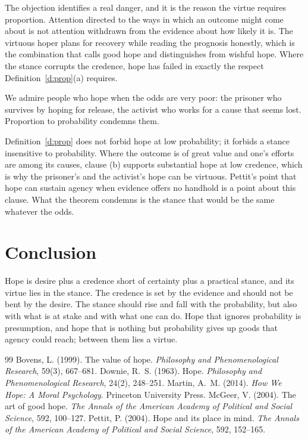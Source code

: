 \documentclass{situationist-preprint}
\begin{document}
\begin{reply}
The objection identifies a real danger, and it is the reason the virtue requires proportion. Attention directed to the ways in which an outcome might come about is not attention withdrawn from the evidence about how likely it is. The virtuous hoper plans for recovery while reading the prognosis honestly, which is the combination that \citet{McGeer2004} calls good hope and distinguishes from wishful hope. Where the stance corrupts the credence, hope has failed in exactly the respect Definition~\ref{d:prop}(a) requires.
\end{reply}

\begin{objection}\label{o:against}
We admire people who hope when the odds are very poor: the prisoner who survives by hoping for release, the activist who works for a cause that seems lost. Proportion to probability condemns them.
\end{objection}

\begin{reply}
Definition~\ref{d:prop} does not forbid hope at low probability; it forbids a stance insensitive to probability. Where the outcome is of great value and one's efforts are among its causes, clause (b) supports substantial hope at low credence, which is why the prisoner's and the activist's hope can be virtuous. Pettit's point that hope can sustain agency when evidence offers no handhold \citep{Pettit2004} is a point about this clause. What the theorem condemns is the stance that would be the same whatever the odds.
\end{reply}

\section{Conclusion}

Hope is desire plus a credence short of certainty plus a practical stance, and its virtue lies in the stance. The credence is set by the evidence and should not be bent by the desire. The stance should rise and fall with the probability, but also with what is at stake and with what one can do. Hope that ignores probability is presumption, and hope that is nothing but probability gives up goods that agency could reach; between them lies a virtue.

\begin{thebibliography}{99}\small
{} Bovens, L. (1999). The value of hope. \emph{Philosophy and Phenomenological Research}, 59(3), 667--681.
 Downie, R.~S. (1963). Hope. \emph{Philosophy and Phenomenological Research}, 24(2), 248--251.
 Martin, A.~M. (2014). \emph{How We Hope: A Moral Psychology}. Princeton University Press.
 McGeer, V. (2004). The art of good hope. \emph{The Annals of the American Academy of Political and Social Science}, 592, 100--127.
 Pettit, P. (2004). Hope and its place in mind. \emph{The Annals of the American Academy of Political and Social Science}, 592, 152--165.
\end{thebibliography}
\end{document}
